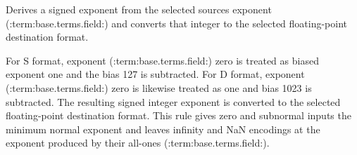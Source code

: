 Derives a signed exponent from the selected source\textquotesingle{}s exponent (:term:base.terms.field:) and converts that integer to the selected floating-point destination format.

For S format, exponent (:term:base.terms.field:) zero is treated as biased exponent one and the bias 127 is subtracted. For D format, exponent (:term:base.terms.field:) zero is likewise treated as one and bias 1023 is subtracted. The resulting signed integer exponent is converted to the selected floating-point destination format. This rule gives zero and subnormal inputs the minimum normal exponent and leaves infinity and NaN encodings at the exponent produced by their all-ones (:term:base.terms.field:).
